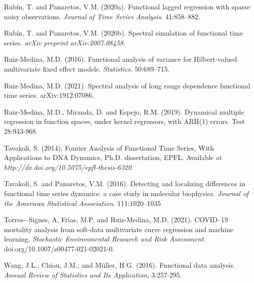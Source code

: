 \documentclass[11pt,a4paper]{article}
\begin{document}
\begin{thebibliography}{9}
Rub\'in, T. and Panaretos, V.M. (2020a). Functional lagged regression with sparse noisy observations. \emph{Journal of Time Series Analysis}. 41:858--882.

 Rub\'in, T. and Panaretos, V.M. (2020b). Spectral simulation of functional time series. \emph{arXiv preprint arXiv:2007.08458}.

 Ruiz-Medina, M.D. (2016).  Functional analysis of variance for Hilbert-valued multivariate fixed effect models. \emph{Statistics}. 50:689--715.

Ruiz-Medina, M.D. (2021). Spectral analysis of long range dependence functional time series.  arXiv:1912.07086.
 	

 Ruiz-Medina, M.D.,  Miranda, D. and  Espejo, R.M. (2019). Dynamical multiple
regression in function spaces, under kernel regressors, with ARH(1) errors. Test
28:943-968.


Tavakoli, S. (2014). Fourier Analysis of Functional Time Series, With Applications to DNA Dynamics, Ph.D. dissertation, EPFL. Available at \emph{http://dx.doi.org/10.5075/epfl-thesis-6320}.

 Tavakoli, S. and Panaretos, V.M. (2016). Detecting and localizing differences in functional time series dynamics: a case study in molecular biophysics. \emph{Journal of the American Statistical Association}. 111:1020--1035

Torres-–Signes, A, Fr\'{\i}as, M.P. and Ruiz-Medina, M.D. (2021).
COVID--19 mortality analysis from soft-data multivariate curve
regression and machine learning.  \emph{Stochastic Environmental Research and Risk Assessment}. doi.org/10.1007/s00477-021-02021-0.

Wang, J.L., Chiou, J.M., and M\"uller, H.G. (2016). Functional data analysis. \emph{Annual Review of Statistics and Its Application}, 3:257-295.

\end{thebibliography}
\end{document}
